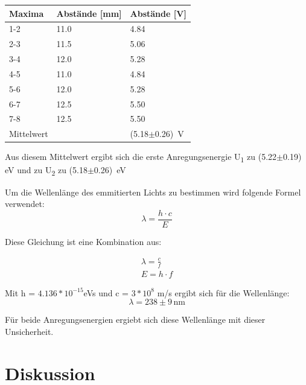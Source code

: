\begin{minipage}{\linewidth}
    \begin{table}[H]
        \centering
    \begin{tabular}{lll}
        \toprule
        Maxima & Abstände [mm] & Abstände [V]\\
        \midrule
        1-2 & 11.0 &   4.84 \\
        2-3 & 11.5 &   5.06\\
        3-4 & 12.0 &   5.28\\
        4-5 & 11.0 &   4.84\\
        5-6 & 12.0 &   5.28\\
        6-7 & 12.5 &   5.50\\
        7-8 & 12.5 &   5.50\\
        \midrule
        Mittelwert & & (5.18$\pm$0.26)\, V      
    \end{tabular}
    
    \label{tab:187}
    \end{table}
\end{minipage}

\noindent Aus diesem Mittelwert ergibt sich die erste Anregungsenergie U\textsubscript{1} zu (5.22$\pm$0.19)\, eV und zu U\textsubscript{2} zu (5.18$\pm$0.26)\, eV

\noindent Um die Wellenlänge des emmitierten Lichts zu bestimmen wird folgende Formel verwendet:
\begin{equation}
    \lambda = \frac{h\cdot c}{E}
\end{equation}

\noindent Diese Gleichung ist eine Kombination aus:

\begin{align}
    \lambda = \frac{c}{f} \nonumber \\
    E = h \cdot f  \nonumber
\end{align}

\noindent Mit h = $4.136 * 10^{-15}$eVs und c =  $3*10^8$ m/s ergibt sich für die Wellenlänge:
\begin{displaymath}
    \lambda = 238\pm 9 \,\text{nm}
\end{displaymath}   

\noindent Für beide Anregungsenergien ergiebt sich diese Wellenlänge mit dieser Unsicherheit.

\section{Diskussion}

